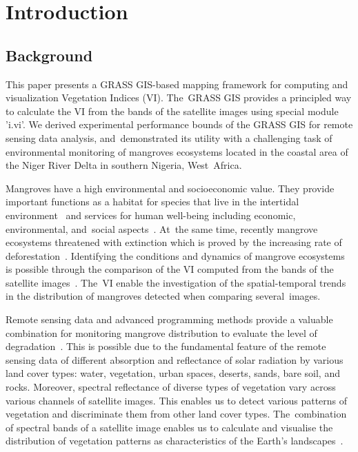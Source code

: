 \documentclass[jmse,article,accept,pdftex,moreauthors]{Definitions/mdpi}
\begin{document}
\section{Introduction}
\unskip

\subsection{Background}

This paper presents a GRASS GIS-based mapping framework for computing and visualization Vegetation Indices (VI). The~GRASS GIS provides a principled way to calculate the VI from the bands of the satellite images using special module 'i.vi'. We derived experimental performance bounds of the GRASS GIS for remote sensing data analysis, and~demonstrated its utility with a challenging task of environmental monitoring of mangroves ecosystems located in the coastal area of the Niger River Delta in southern Nigeria, West~Africa.%

Mangroves have a high environmental and socioeconomic value. They provide important functions as a habitat for species that live in the intertidal environment~\cite{James} and services for human well-being including economic, environmental, and~social aspects~\cite{AKANNI2018387}. At~the same time, recently mangrove ecosystems threatened with extinction which is proved by the increasing rate of deforestation~\cite{Enaruvbe2016,Numbere2021,Osuji,Fasona}. Identifying the conditions and dynamics of mangrove ecosystems is possible through the comparison of the VI computed from the bands of the satellite images~\cite{HATI2022,ALATORRE201698,SATHISH2021102054}. The~VI enable the investigation of the spatial-temporal trends in the distribution of mangroves detected when comparing several~images.

Remote sensing data and advanced programming methods provide a valuable combination for monitoring mangrove distribution to evaluate the level of degradation~\cite{Hu}. This is possible due to the fundamental feature of the remote sensing data of different absorption and reflectance of solar radiation by various land cover types: water, vegetation, urban spaces, deserts, sands, bare soil, and rocks. Moreover, spectral reflectance of diverse types of vegetation vary across various channels of satellite images. This enables us to detect various patterns of vegetation and discriminate them from other land cover types. The~combination of spectral bands of a satellite image enables us to calculate and visualise the distribution of vegetation patterns as characteristics of the Earth's landscapes~\cite{CHOPADE2023118839,GITAU2023102898,MISHRA2021107486}.
\end{document}
